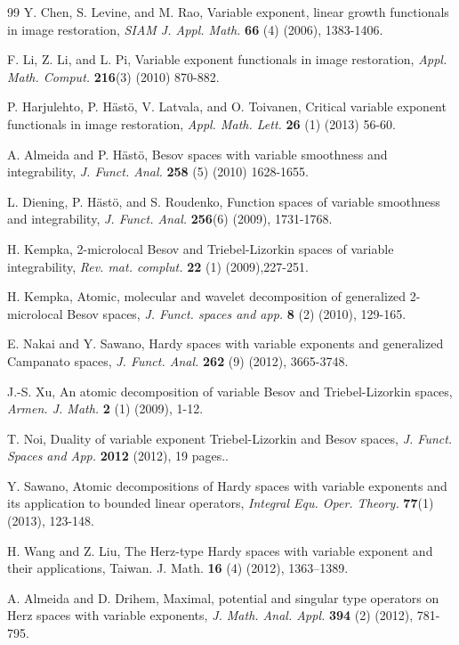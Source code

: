 \documentclass[oneside,reqno]{amsart}
\numberwithin{equation}{section}
\theoremstyle{definition}
\begin{document}
\begin{thebibliography}{99}
 Y. Chen, S. Levine, and M. Rao, Variable exponent, linear growth functionals in image restoration, \textit{SIAM J. Appl. Math.}  {\bf66} (4) (2006),  1383-1406.

 F. Li, Z. Li, and L. Pi, Variable exponent functionals in image restoration, \textit{Appl. Math. Comput.}  {\bf 216}(3) (2010) 870-882.

 P. Harjulehto, P. H\"ast\"o, V. Latvala, and O. Toivanen, Critical variable exponent functionals in image restoration, \textit{Appl. Math. Lett.} {\bf 26} (1) (2013) 56-60.


 A. Almeida and P. H\"ast\"o, Besov spaces with variable smoothness and integrability, \textit{J. Funct. Anal.} {\bf 258} (5) (2010)  1628-1655.

 L. Diening, P. Häst\"o, and S. Roudenko, Function spaces of variable smoothness and integrability, \textit{J. Funct. Anal.} {\bf 256}(6) (2009),  1731-1768.


 H. Kempka, 2-microlocal Besov and Triebel-Lizorkin spaces of variable integrability, \textit{Rev. mat. complut.} {\bf 22} (1) (2009),227-251.

 H. Kempka, Atomic, molecular and wavelet decomposition of generalized 2-microlocal Besov spaces, \textit{J. Funct. spaces and app.} {\bf 8} (2) (2010), 129-165.

 E. Nakai and Y. Sawano, Hardy spaces with variable exponents and generalized Campanato spaces, \textit{J. Funct. Anal.} {\bf 262} (9) (2012), 3665-3748.



 J.-S. Xu, An atomic decomposition of variable Besov and Triebel-Lizorkin spaces, \textit{Armen. J. Math.} {\bf 2} (1) (2009),  1-12.

 T. Noi, Duality of variable exponent Triebel-Lizorkin and Besov spaces, \textit{J. Funct. Spaces and App.} {\bf  2012} (2012),  19 pages..

 Y. Sawano, Atomic decompositions of Hardy spaces with variable exponents and its application to bounded linear operators, \textit{Integral Equ. Oper. Theory.}  {\bf 77}(1) (2013), 123-148.

H. Wang and Z. Liu, The Herz-type Hardy spaces with
variable exponent and their applications, {Taiwan. J. Math.} {\bf 16} (4) (2012),  1363–1389.

A. Almeida and D. Drihem, Maximal, potential and singular type operators on Herz spaces with variable exponents, \textit{J. Math. Anal. Appl.}  {\bf 394} (2) (2012), 781-795.



\end{thebibliography}
\end{document}
